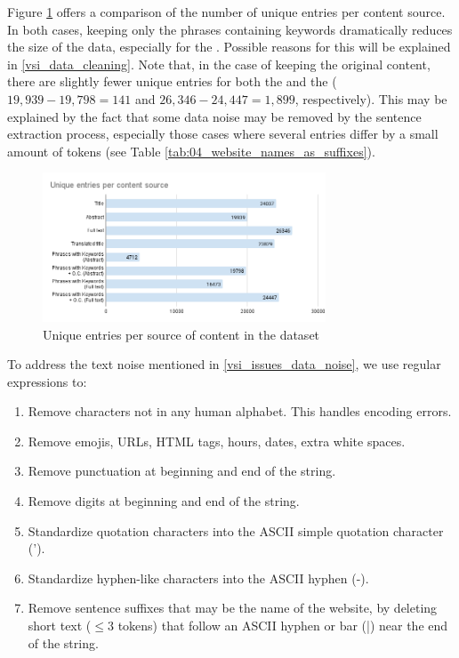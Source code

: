 Figure \ref{fig:05_unique_entries_keyphrases_vsi} offers a comparison of the number of unique entries per content source. In both cases, keeping only the phrases containing keywords dramatically reduces the size of the data, especially for the \trafilaturaAbstract{}. Possible reasons for this will be explained in \headerName{} \ref{vsi_data_cleaning}. Note that, in the case of keeping the original content, there are slightly fewer unique entries for both the \trafilaturaAbstract{} and the \trafilaturaFulltext{} ($19,939-19,798 = 141$ and $26,346-24,447=1,899$, respectively). This may be explained by the fact that some data noise may be removed by the sentence extraction process, especially those cases where several entries differ by a small amount of tokens (see Table \ref{tab:04_website_names_as_suffixes}).

\begin{figure}
    \centering
    \includegraphics[width=0.750\textwidth]{Figures/05/Unique entries per content source_keyphrases.png}
    \caption{Unique entries per source of content in the \VSI{} dataset}
    \label{fig:05_unique_entries_keyphrases_vsi}
\end{figure}


\label{vsi_data_cleaning}



\label{vsi_string_cleaning}

To address the text noise mentioned in \headerName{} \ref{vsi_issues_data_noise}, we use regular expressions to:

\begin{enumerate}
    \item Remove characters not in any human alphabet. This handles encoding errors.
    \item Remove emojis, URLs, HTML tags, hours, dates, extra white spaces.
    \item Remove punctuation at beginning and end of the string.
    \item Remove digits at beginning and end of the string.
    \item Standardize quotation characters into the ASCII simple quotation character (').
    \item Standardize hyphen-like characters into the ASCII hyphen (-).
    \item Remove sentence suffixes that may be the name of the website, by deleting short text ($\leq 3$ tokens) that follow an ASCII hyphen or bar (|) near the end of the string.
\end{enumerate}

